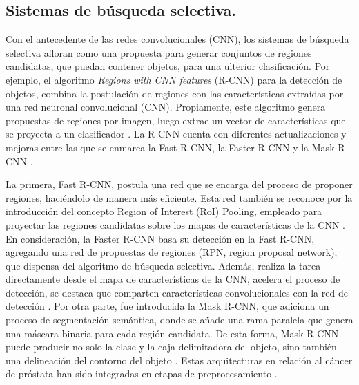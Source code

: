 



\subsection{Sistemas de búsqueda selectiva. }Con el antecedente de las redes convolucionales (CNN), los sistemas de búsqueda selectiva afloran como una propuesta para generar conjuntos de regiones candidatas, que puedan contener objetos, para una ulterior clasificación. Por ejemplo, el algoritmo \textit{Regions with CNN features} (R-CNN) para la detección de objetos, combina la postulación de regiones con las características extraídas por una red neuronal convolucional (CNN).
Propiamente, este algoritmo genera propuestas de regiones por imagen, luego extrae un vector de características que se proyecta a un clasificador . La R-CNN cuenta con diferentes actualizaciones y mejoras entre las que se enmarca la Fast R-CNN, la Faster R-CNN y la Mask R-CNN . \par La primera, Fast R-CNN, postula una red que se encarga del proceso de proponer regiones, haciéndolo de manera más eficiente. Esta red también se reconoce por la introducción del concepto Region of Interest (RoI) Pooling, empleado para proyectar las regiones candidatas sobre los mapas de características de la CNN . En consideración, la Faster R-CNN basa su detección en la Fast R-CNN, agregando una red de propuestas de regiones (RPN, region proposal network), que dispensa del algoritmo de búsqueda selectiva. Además, realiza la tarea directamente desde el mapa de características de la CNN, acelera el proceso de detección, se destaca que comparten características convolucionales con la red de detección . Por otra parte, fue introducida la Mask R-CNN, que adiciona un proceso de segmentación semántica, donde se añade una rama paralela que genera una máscara binaria para cada región candidata. De esta forma, Mask R-CNN puede producir no solo la clase y la caja delimitadora del objeto, sino también una delineación del contorno del objeto  . Estas arquitecturas en relación al cáncer de próstata han sido integradas en etapas de preprocesamiento .


